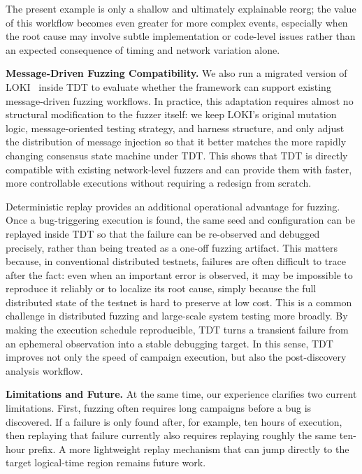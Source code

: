 The present example is only a shallow and ultimately explainable reorg; the value of this workflow becomes even greater for more complex events, especially when the root cause may involve subtle implementation or code-level issues rather than an expected consequence of timing and network variation alone.


\smallskip
\noindent\textbf{Message-Driven Fuzzing Compatibility.}
We also run a migrated version of \textsc{LOKI}~\cite{ma2023loki} inside TDT to evaluate whether the framework can support existing message-driven fuzzing workflows. In practice, this adaptation requires almost no structural modification to the fuzzer itself: we keep \textsc{LOKI}'s original mutation logic, message-oriented testing strategy, and harness structure, and only adjust the distribution of message injection so that it better matches the more rapidly changing consensus state machine under TDT. This shows that TDT is directly compatible with existing network-level fuzzers and can provide them with faster, more controllable executions without requiring a redesign from scratch.

Deterministic replay provides an additional operational advantage for fuzzing. Once a bug-triggering execution is found, the same seed and configuration can be replayed inside TDT so that the failure can be re-observed and debugged precisely, rather than being treated as a one-off fuzzing artifact. This matters because, in conventional distributed testnets, failures are often difficult to trace after the fact: even when an important error is observed, it may be impossible to reproduce it reliably or to localize its root cause, simply because the full distributed state of the testnet is hard to preserve at low cost. This is a common challenge in distributed fuzzing and large-scale system testing more broadly. By making the execution schedule reproducible, TDT turns a transient failure from an ephemeral observation into a stable debugging target. In this sense, TDT improves not only the speed of campaign execution, but also the post-discovery analysis workflow.

\smallskip
\noindent\textbf{Limitations and Future.}
At the same time, our experience clarifies two current limitations. First, fuzzing often requires long campaigns before a bug is discovered. If a failure is only found after, for example, ten hours of execution, then replaying that failure currently also requires replaying roughly the same ten-hour prefix. A more lightweight replay mechanism that can jump directly to the target logical-time region remains future work.

